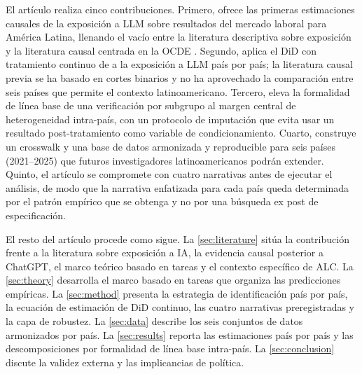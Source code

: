 El art\'{i}culo realiza cinco contribuciones. Primero, ofrece las primeras estimaciones causales de la exposici\'{o}n a LLM sobre resultados del mercado laboral para Am\'{e}rica Latina, llenando el vac\'{i}o entre la literatura descriptiva sobre exposici\'{o}n \citep{Azuara2024_idb_ai, Ciaschi2025_distributive_ai, EganadelSol2025_ai_lac} y la literatura causal centrada en la OCDE \citep{HumlumVestergaard2025_llm, Hartley2024_labor_effects, Chen2025_llm_unemployment}. Segundo, aplica el DiD con tratamiento continuo de \citet{CallawayCGBS2024_continuous} a la exposici\'{o}n a LLM pa\'{i}s por pa\'{i}s; la literatura causal previa se ha basado en cortes binarios y no ha aprovechado la comparaci\'{o}n entre seis pa\'{i}ses que permite el contexto latinoamericano. Tercero, eleva la formalidad de l\'{i}nea base de una verificaci\'{o}n por subgrupo al margen central de heterogeneidad intra-pa\'{i}s, con un protocolo de imputaci\'{o}n que evita usar un resultado post-tratamiento como variable de condicionamiento. Cuarto, construye un crosswalk y una base de datos armonizada y reproducible para seis pa\'{i}ses (2021--2025) que futuros investigadores latinoamericanos podr\'{a}n extender. Quinto, el art\'{i}culo se compromete con cuatro narrativas antes de ejecutar el an\'{a}lisis, de modo que la narrativa enfatizada para cada pa\'{i}s queda determinada por el patr\'{o}n emp\'{i}rico que se obtenga y no por una b\'{u}squeda ex post de especificaci\'{o}n.

El resto del art\'{i}culo procede como sigue. La \cref{sec:literature} sit\'{u}a la contribuci\'{o}n frente a la literatura sobre exposici\'{o}n a IA, la evidencia causal posterior a ChatGPT, el marco te\'{o}rico basado en tareas y el contexto espec\'{i}fico de ALC. La \cref{sec:theory} desarrolla el marco basado en tareas que organiza las predicciones emp\'{i}ricas. La \cref{sec:method} presenta la estrategia de identificaci\'{o}n pa\'{i}s por pa\'{i}s, la ecuaci\'{o}n de estimaci\'{o}n de DiD continuo, las cuatro narrativas preregistradas y la capa de robustez. La \cref{sec:data} describe los seis conjuntos de datos armonizados por pa\'{i}s. La \cref{sec:results} reporta las estimaciones pa\'{i}s por pa\'{i}s y las descomposiciones por formalidad de l\'{i}nea base intra-pa\'{i}s. La \cref{sec:conclusion} discute la validez externa y las implicancias de pol\'{i}tica.
